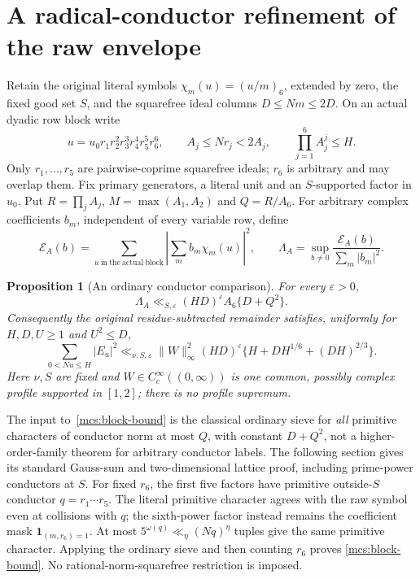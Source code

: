 \documentclass[11pt]{article}
\newtheorem{proposition}[theorem]{Proposition}
\theoremstyle{definition}\newtheorem{definition}[theorem]{Definition}
\theoremstyle{remark}\newtheorem{remark}[theorem]{Remark}
\begin{document}
\section{A radical-conductor refinement of the raw envelope}\label{mcs:core}
Retain the original literal symbols $\chi_m(u)=(u/m)_6$, extended by zero,
the fixed good set $S$, and the squarefree ideal columns $D\le Nm\le2D$.
On an actual dyadic row block write
\[
 u=u_0r_1r_2^2r_3^3r_4^4r_5^5r_6^6,\qquad
 A_j\le Nr_j<2A_j,\qquad \prod_{j=1}^6A_j^j\le H.
\]
Only $r_1,\ldots,r_5$ are pairwise-coprime squarefree ideals;
$r_6$ is arbitrary and may overlap them. Fix primary generators,
a literal unit and an $S$-supported factor in $u_0$. Put
$R=\prod_jA_j$, $M=\max(A_1,A_2)$ and $Q=R/A_6$.
For arbitrary complex coefficients $b_m$, independent of every variable row,
define
\[
 \mathcal E_A(b)=\sum_{u\ \mathrm{in\ the\ actual\ block}}
       \left|\sum_m b_m\chi_m(u)\right|^2,
 \qquad \Lambda_A=\sup_{b\ne0}\frac{\mathcal E_A(b)}{\sum_m|b_m|^2}.
\]
\begin{proposition}[An ordinary conductor comparison]\label{mcs:block}
For every $\varepsilon>0$,
\begin{equation}\label{mcs:block-bound}
 \Lambda_A\ll_{S,\varepsilon}(HD)^\varepsilon
             A_6\{D+Q^2\}.
\end{equation}
Consequently the original residue-subtracted remainder satisfies,
uniformly for $H,D,U\ge1$ and $U^2\le D$,
\begin{equation}\label{mcs:uniform}
 \sum_{0<Nu\le H}|E_u|^2
 \ll_{\nu,S,\varepsilon}\|W\|_\infty^2(HD)^\varepsilon
       \{H+DH^{1/6}+(DH)^{2/3}\}.
\end{equation}
Here $\nu,S$ are fixed and $W\in C_c^\infty((0,\infty))$ is one common,
possibly complex profile supported in $[1,2]$; there is no profile supremum.
\end{proposition}
The input to~\eqref{mcs:block-bound} is the classical ordinary sieve for
\emph{all} primitive characters of conductor norm at most $Q$, with constant
$D+Q^2$, not a higher-order-family theorem for arbitrary conductor labels.
The following section gives its standard Gauss-sum and two-dimensional
lattice proof, including prime-power conductors at $S$.
For fixed $r_6$, the first five factors have primitive outside-$S$
conductor $q=r_1\cdots r_5$. The literal primitive character agrees with
the raw symbol even at collisions with $q$; the sixth-power factor instead
remains the coefficient mask $\mathbf1_{(m,r_6)=1}$.
At most $5^{\omega(q)}\ll_\eta(Nq)^\eta$ tuples give the same primitive
character. Applying the ordinary sieve and then counting $r_6$ proves
\eqref{mcs:block-bound}. No rational-norm-squarefree restriction is imposed.
\end{document}
